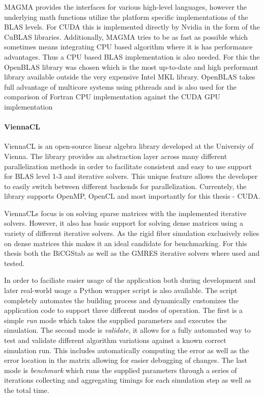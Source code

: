 \documentclass[a4paper,11pt]{kth-mag}
\begin{document}
MAGMA provides the interfaces for various high-level languages, however the underlying math functions utilize the platform specific implementations of the BLAS levels. For CUDA this is implemented directly by Nvidia in the form of the CuBLAS libraries. Additionally, MAGMA tries to be as fast as possible which sometimes means integrating CPU based algorithm where it is has performance advantages. Thus a CPU based BLAS implementation is also needed. For this the OpenBLAS library was chosen which is the most up-to-date and high performant library available outside the very expensive Intel MKL library. OpenBLAS takes full advantage of multicore systems using pthreads and is also used for the comparison of Fortran CPU implementation against the CUDA GPU implementation

\paragraph{ViennaCL}
ViennaCL is an open-source linear algebra library developed at the Universiy of Vienna. The library provides an abstraction layer across many different parallelization methods in order to facilitate consistent and easy to use support for BLAS level 1-3 and iterative solvers. This unique feature allows the developer to easily switch between different backends for parallelization. Currentely, the library supports OpenMP, OpenCL and most importantly for this thesis - CUDA.

ViennaCLs focus is on solving sparse matrices with the implemented iterative solvers. However, it also has basic support for solving dense matrices using a variety of different iterative solvers. As the rigid fiber simulation exclusively relies on dense matrices this makes it an ideal candidate for benchmarking. For this thesis both the BiCGStab as well as the GMRES iterative solvers where used and tested.

In order to faciliate easier usage of the application both during development and later real-world usage a Python wrapper script is also available. The script completely automates the building process and dynamically customizes the application code to support three different modes of operation. The first is a simple \emph{run} mode which takes the supplied parameters and executes the simulation. The second mode is \emph{validate}, it allows for a fully automated way to test and validate different algorithm variations against a known correct simulation run. This includes automatically computing the error as well as the error location in the matrix allowing for easier debugging of changes. The last mode is \emph{benchmark} which runs the supplied parameters through a series of iterations collecting and aggregating timings for each simulation step as well as the total time.
\end{document}
